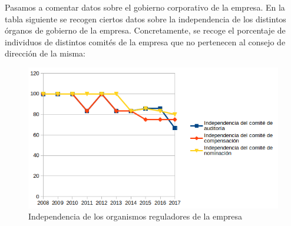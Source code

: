 \documentclass[11pt]{article}
\theoremstyle{plain}
\theoremstyle{definition}
\begin{document}
Pasamos a comentar datos sobre el gobierno corporativo de la empresa.
En la tabla siguiente se recogen ciertos datos sobre la independencia
de los distintos órganos de gobierno de la empresa. Concretamente,
se recoge el porcentaje de individuos de distintos comités de la empresa
que no pertenecen al consejo de dirección de la misma:

\begin{figure}[H]
  \centering \includegraphics[width=\textwidth]{graphs/government.png}
  \caption{Independencia de los organismos reguladores de la empresa}
\end{figure}

\printbibliography
\end{document}

